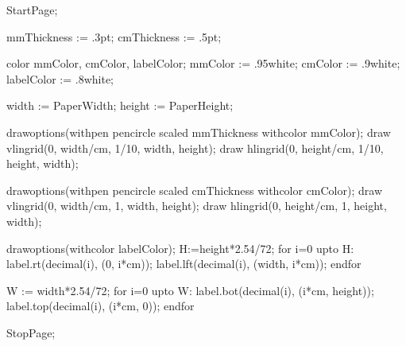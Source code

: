 


\startmodule [grid]

\unprotect


\setupbackgrounds
	[page]
	[background=grid]


	StartPage;

	mmThickness := .3pt;
	cmThickness := .5pt;

	color mmColor, cmColor, labelColor;
	mmColor    := .95white;
	cmColor    := .9white;
	labelColor := .8white;

	width  := PaperWidth;
	height := PaperHeight;

	drawoptions(withpen pencircle scaled mmThickness withcolor mmColor);
	draw vlingrid(0, width/cm,  1/10, width,  height);
	draw hlingrid(0, height/cm, 1/10, height, width);

	drawoptions(withpen pencircle scaled cmThickness withcolor cmColor);
	draw vlingrid(0, width/cm,  1, width,  height);
	draw hlingrid(0, height/cm, 1, height, width);

	drawoptions(withcolor labelColor);
	H:=height*2.54/72;
	for i=0 upto H:
		label.rt(decimal(i), (0, i*cm));
		label.lft(decimal(i), (width, i*cm));
	endfor

	W := width*2.54/72;
	for i=0 upto W:
		label.bot(decimal(i), (i*cm, height));
		label.top(decimal(i), (i*cm, 0));
	endfor

	StopPage;
\stopreusableMPgraphic

\protect

\stopmodule
